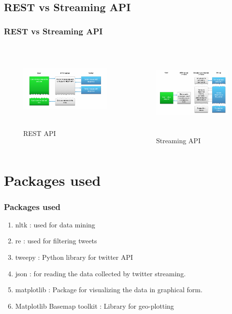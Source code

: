 \documentclass{beamer}
\begin{document}
\subsection{REST vs Streaming API}
\begin{frame}
\frametitle{REST vs Streaming API}
\begin{columns}
\begin{figure}
\includegraphics[width=7cm,height=4.1cm]{./Images/REST_API.png}
\caption{REST API}
\end{figure}
\begin{figure}
\includegraphics[width=6cm,height=4.5cm]{./Images/Streaming_API.png}
\caption{Streaming API}
\end{figure}
\end{columns}
\end{frame}

\section{Packages used}
\begin{frame}
\frametitle{Packages used}
\begin{enumerate}
\item nltk : used for data mining
\item re : used for filtering tweets
\item tweepy : Python library for twitter API
\item json : for reading the data collected by twitter streaming.
\item matplotlib : Package for visualizing the data in graphical form.
\item Matplotlib Basemap toolkit : Library for geo-plotting
\end{enumerate}
\end{frame}
\end{document}
